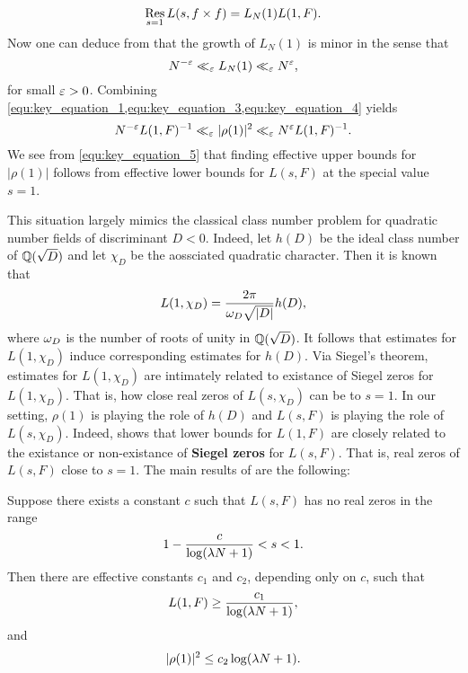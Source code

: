 \documentclass[12pt,reqno,oneside]{amsart}
\begin{document}
    \begin{equation}\label{equ:key_equation_3}
        \operatorname*{\mathrm{Res}}_{s = 1}L(s,f \times f) = L_{N}(1)L(1,F).
    \end{equation}
    Now one can deduce from \cite{GJ} that the growth of $L_{N}(1)$ is minor in the sense that
    \begin{equation}\label{equ:key_equation_4}
        N^{-\varepsilon} \ll_{\varepsilon} L_{N}(1) \ll_{\varepsilon} N^{\varepsilon},
    \end{equation}
    for small $\varepsilon > 0$. Combining \cref{equ:key_equation_1,equ:key_equation_3,equ:key_equation_4} yields
    \begin{equation}\label{equ:key_equation_5}
        N^{-\varepsilon}L(1,F)^{-1} \ll_{\varepsilon} |\rho(1)|^{2} \ll_{\varepsilon} N^{\varepsilon}L(1,F)^{-1}.
    \end{equation}
    We see from \cref{equ:key_equation_5} that finding effective upper bounds for $|\rho(1)|$ follows from effective lower bounds for $L(s,F)$ at the special value $s = 1$.

    This situation largely mimics the classical class number problem for quadratic number fields of discriminant $D < 0$. Indeed, let $h(D)$ be the ideal class number of $\mathbb{Q}(\sqrt{D})$ and let $\chi_{D}$ be the aossciated quadratic character. Then it is known that
    \[
        L(1,\chi_{D}) = \frac{2\pi}{\omega_{D}\sqrt{|D|}}h(D),
    \]
    where $\omega_{D}$ is the number of roots of unity in $\mathbb{Q}(\sqrt{D})$. It follows that estimates for $L(1,\chi_{D})$ induce corresponding estimates for $h(D)$. Via Siegel's theorem, estimates for $L(1,\chi_{D})$ are intimately related to existance of Siegel zeros for $L(1,\chi_{D})$. That is, how close real zeros of $L(s,\chi_{D})$ can be to $s = 1$. In our setting, $\rho(1)$ is playing the role of $h(D)$ and $L(s,F)$ is playing the role of $L(s,\chi_{D})$. Indeed, \cite{HL} shows that lower bounds for $L(1,F)$ are closely related to the existance or non-existance of \textbf{Siegel zeros} for $L(s,F)$. That is, real zeros of $L(s,F)$ close to $s = 1$. The main results of \cite{HL} are the following:

    \begin{theorem}\label{thm:main_theorem_1}
        Suppose there exists a constant $c$ such that $L(s,F)$ has no real zeros in the range
        \[
            1-\frac{c}{\log(\lambda N+1)} < s < 1.
        \]
        Then there are effective constants $c_{1}$ and $c_{2}$, depending only on $c$, such that
        \[
            L(1,F) \ge \frac{c_{1}}{\log(\lambda N+1)},
        \]
        and
        \[
            |\rho(1)|^{2} \le c_{2}\log(\lambda N+1).
        \]
    \end{theorem}
\end{document}
